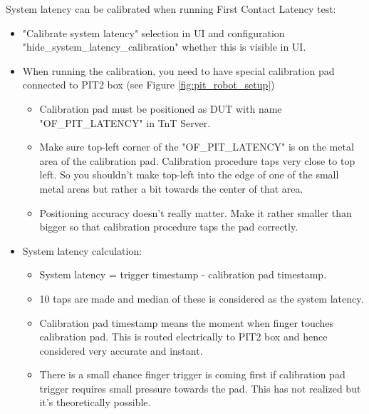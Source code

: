 System latency can be calibrated when running First Contact Latency test:
\begin{itemize}
	\item "Calibrate system latency" selection in UI and configuration "hide\_system\_latency\_calibration" whether this is visible in UI.
	\item When running the calibration, you need to have special calibration pad connected to PIT2 box (see Figure \ref{fig:pit_robot_setup})
		\begin{itemize}
			\item Calibration pad must be positioned as DUT with name "OF\_PIT\_LATENCY" in TnT Server.
			\item Make sure top-left corner of the "OF\_PIT\_LATENCY" is on the metal area of the calibration pad. Calibration procedure taps very close to top left. So you shouldn't make top-left into the edge of one of the small metal areas but rather a bit towards the center of that area.
			\item Positioning accuracy doesn't really matter. Make it rather smaller than bigger so that calibration procedure taps the pad correctly.
		\end{itemize}
	\item System latency calculation:
		\begin{itemize}
			\item System latency = trigger timestamp - calibration pad timestamp.
			\item 10 taps are made and median of these is considered as the system latency.
			\item Calibration pad timestamp means the moment when finger touches calibration pad. This is routed electrically to PIT2 box and hence considered very accurate and instant.
			\item There is a small chance finger trigger is coming first if calibration pad trigger requires small pressure towards the pad. This has not realized but it's theoretically possible.
		\end{itemize} 
\end{itemize}



